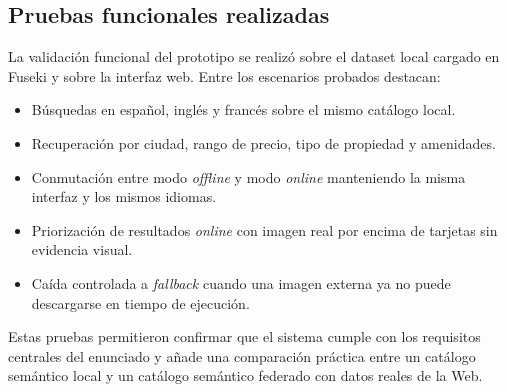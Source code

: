 \subsection{Pruebas funcionales realizadas}

La validación funcional del prototipo se realizó sobre el dataset local cargado en
Fuseki y sobre la interfaz web. Entre los escenarios probados destacan:

\begin{itemize}
  \item Búsquedas en español, inglés y francés sobre el mismo catálogo local.
  \item Recuperación por ciudad, rango de precio, tipo de propiedad y amenidades.
  \item Conmutación entre modo \textit{offline} y modo \textit{online} manteniendo la
  misma interfaz y los mismos idiomas.
  \item Priorización de resultados \textit{online} con imagen real por encima de tarjetas
  sin evidencia visual.
  \item Caída controlada a \textit{fallback} cuando una imagen externa ya no puede
  descargarse en tiempo de ejecución.
\end{itemize}

Estas pruebas permitieron confirmar que el sistema cumple con los requisitos centrales
del enunciado y añade una comparación práctica entre un catálogo semántico local y un
catálogo semántico federado con datos reales de la Web.

